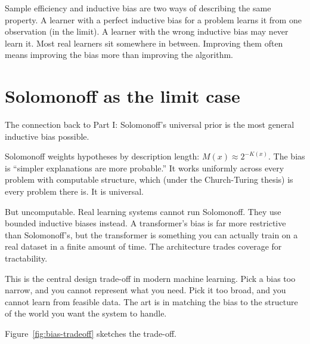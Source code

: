 Sample efficiency and inductive bias are two ways of describing the same property. A learner with a perfect inductive bias for a problem learns it from one observation (in the limit). A learner with the wrong inductive bias may never learn it. Most real learners sit somewhere in between. Improving them often means improving the bias more than improving the algorithm.

\section*{Solomonoff as the limit case}

The connection back to Part I: Solomonoff's universal prior is the most general inductive bias possible.

Solomonoff weights hypotheses by description length: $M(x) \approx 2^{-K(x)}$. The bias is ``simpler explanations are more probable.'' It works uniformly across every problem with computable structure, which (under the Church-Turing thesis) is every problem there is. It is universal.

But uncomputable. Real learning systems cannot run Solomonoff. They use bounded inductive biases instead. A transformer's bias is far more restrictive than Solomonoff's, but the transformer is something you can actually train on a real dataset in a finite amount of time. The architecture trades coverage for tractability.

This is the central design trade-off in modern machine learning. Pick a bias too narrow, and you cannot represent what you need. Pick it too broad, and you cannot learn from feasible data. The art is in matching the bias to the structure of the world you want the system to handle.

Figure~\ref{fig:bias-tradeoff} sketches the trade-off.

